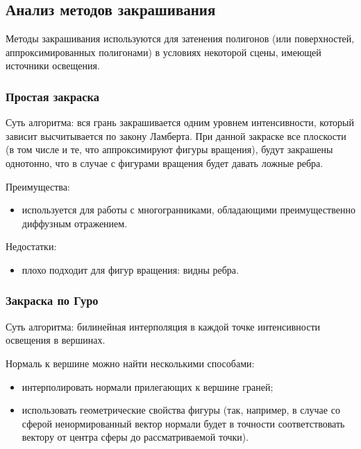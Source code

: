 \subsection{Анализ методов закрашивания}

Методы закрашивания используются для затенения полигонов
(или поверхностей, аппроксимированных полигонами)
в условиях некоторой сцены, имеющей источники освещения.

\subsubsection{Простая закраска}

Суть алгоритма: вся грань закрашивается одним уровнем интенсивности,
который зависит высчитывается по закону Ламберта\cite{rogers}.
При данной закраске все плоскости (в том числе и те,
что аппроксимируют фигуры вращения),
будут закрашены однотонно,
что в случае с фигурами вращения будет давать ложные ребра.

Преимущества:
\begin{itemize}
    \item используется для работы с многогранниками, обладающими преимущественно диффузным отражением.
\end{itemize}

Недостатки:

\begin{itemize}
    \item плохо подходит для фигур вращения: видны ребра.
\end{itemize}

\subsubsection{Закраска по Гуро}
Суть алгоритма: билинейная интерполяция в каждой точке интенсивности освещения в вершинах\cite{lmodels}.

Нормаль к вершине можно найти несколькими способами:
\begin{itemize}
    \item интерполировать нормали прилегающих к вершине граней;
    \item использовать геометрические свойства фигуры (так, например, в случае со сферой ненормированный вектор нормали будет в точности соответствовать вектору от центра сферы до рассматриваемой точки).
\end{itemize}

